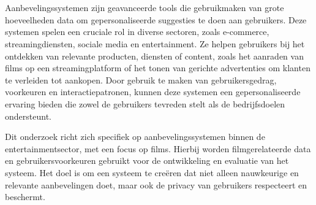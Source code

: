 
\chapter{}%
\label{ch:inleiding}



Aanbevelingssystemen zijn geavanceerde tools die gebruikmaken van grote hoeveelheden data om gepersonaliseerde suggesties te doen aan gebruikers. Deze systemen spelen een cruciale rol in diverse sectoren, zoals e-commerce, streamingdiensten, sociale media en entertainment. Ze helpen gebruikers bij het ontdekken van relevante producten, diensten of content, zoals het aanraden van films op een streamingplatform of het tonen van gerichte advertenties om klanten te verleiden tot aankopen. Door gebruik te maken van gebruikersgedrag, voorkeuren en interactiepatronen, kunnen deze systemen een gepersonaliseerde ervaring bieden die zowel de gebruikers tevreden stelt als de bedrijfsdoelen ondersteunt.

Dit onderzoek richt zich specifiek op aanbevelingssystemen binnen de entertainmentsector, met een focus op films. Hierbij worden filmgerelateerde data en gebruikersvoorkeuren gebruikt voor de ontwikkeling en evaluatie van het systeem. Het doel is om een systeem te creëren dat niet alleen nauwkeurige en relevante aanbevelingen doet, maar ook de privacy van gebruikers respecteert en beschermt.

